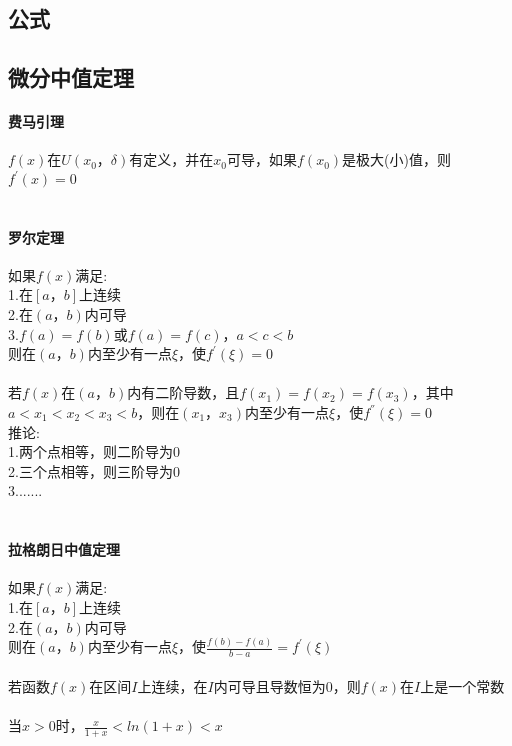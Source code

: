 \documentclass{article}
\begin{document}
\begin{flushleft}
	\LARGE
	
	\section{公式}
	
	\subsection{微分中值定理}
	
	\paragraph{费马引理}
	$f(x)$在$U(x_0，\delta)$有定义，并在$x_0$可导，如果$f(x_0)$是极大(小)值，则$f^{'}(x)=0$\\
	~\\
	\paragraph{罗尔定理}
	如果$f(x)$满足:\\
	1.在$[a，b]$上连续\\
	2.在$(a，b)$内可导\\
	3.$f(a)=f(b)$或$f(a)=f(c)， a<c<b$\\
	则在$(a，b)$内至少有一点$\xi$，使$f^{'}(\xi)=0$\\
	~\\
	若$f(x)$在$(a，b)$内有二阶导数，且$f(x_1)=f(x_2)=f(x_3)$，其中$a<x_1<x_2<x_3<b$，则在$(x_1，x_3)$内至少有一点$\xi$，使$f^{''}(\xi)=0$\\
	推论:\\
	1.两个点相等，则二阶导为0\\
	2.三个点相等，则三阶导为0\\
	3.......\\
	~\\
	\paragraph{拉格朗日中值定理}
	如果$f(x)$满足:\\
	1.在$[a，b]$上连续\\
	2.在$(a，b)$内可导\\
	则在$(a，b)$内至少有一点$\xi$，使$\frac{f(b)-f(a)}{b-a}=f^{'}(\xi)$\\
	~\\
	若函数$f(x)$在区间$I$上连续，在$I$内可导且导数恒为0，则$f(x)$在$I$上是一个常数\\
	~\\
	当$x>0$时，$\frac{x}{1+x}<ln(1+x)<x$\\
	~\\

\end{flushleft}
\end{document}
